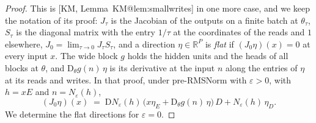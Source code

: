 \documentclass[10pt]{article}
\makeatletter
\theoremstyle{definition}
\theoremstyle{remark}
\newcommand{\R}{\mathbb{R}}
\newcommand{\Der}{\mathrm{D}}
\newcommand{\KMn}[1]{\csname KM@#1\endcsname}
\newcommand{\KM}[2]{[KM, #1~\KMn{#2}]}
\makeatother
\begin{document}
\begin{proof}
This is \KM{Lemma}{lem:smallwrites} in one more case, and we keep the notation of its proof: $J_\tau$ is the Jacobian of the outputs on a finite batch at $\theta_\tau$, $S_\tau$ is the diagonal matrix with the entry $1/\tau$ at the coordinates of the reads and $1$ elsewhere, $J_0 = \lim_{\tau\to0}J_\tau S_\tau$, and a direction $\eta \in \R^P$ is \emph{flat} if $(J_0\eta)(x) = 0$ at every input $x$. The wide block $g$ holds the hidden units and the heads of all blocks at $\theta$, and $\Der_\theta g(n)\,\eta$ is its derivative at the input $n$ along the entries of $\eta$ at its reads and writes. In that proof, under pre-RMSNorm with $\varepsilon > 0$, with $h = xE$ and $n = N_\varepsilon(h)$,
\[
(J_0\eta)(x) \;=\; \Der N_\varepsilon(h)\,\big(x\eta_E + \Der_\theta g(n)\,\eta\big)\,D + N_\varepsilon(h)\,\eta_D .
\]
We determine the flat directions for $\varepsilon = 0$.


\end{proof}
\end{document}

